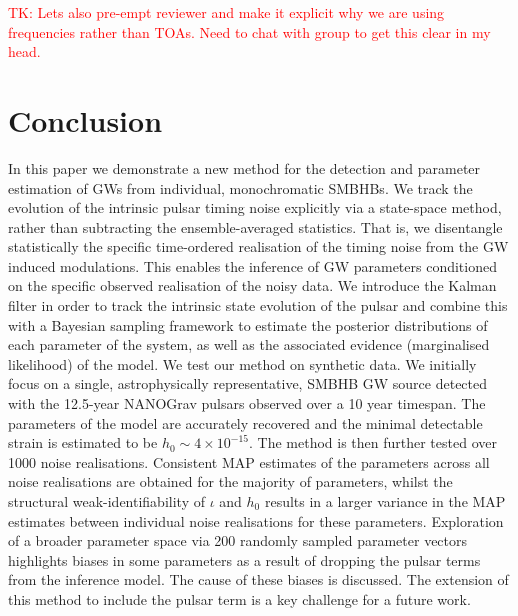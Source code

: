 \documentclass[fleqn,usenatbib,useAMS]{mnras}
\begin{document}
\textcolor{red}{TK: Lets also pre-empt reviewer and make it explicit why we are using frequencies rather than TOAs. Need to chat with group to get this clear in my head.}


\section{Conclusion}
In this paper we demonstrate a new method for the detection and parameter estimation of GWs from individual, monochromatic SMBHBs. We track the evolution of the intrinsic pulsar timing noise explicitly via a state-space method, rather than subtracting the ensemble-averaged statistics. That is, we disentangle statistically the specific time-ordered realisation of the timing noise from the GW induced modulations. This enables the inference of GW parameters conditioned on the specific observed realisation of the noisy data. We introduce the Kalman filter in order to track the intrinsic state evolution of the pulsar and combine this with a Bayesian sampling framework to estimate the posterior distributions of each parameter of the system, as well as the associated evidence (marginalised likelihood) of the model. We test our method on synthetic data. We initially focus on a single, astrophysically representative, SMBHB GW source detected with the 12.5-year NANOGrav pulsars observed over a 10 year timespan. The parameters of the model are accurately recovered and the minimal detectable strain is estimated to be $h_0 \sim 4 \times 10^{-15}$. The method is then further tested over 1000 noise realisations. Consistent MAP estimates of the parameters across all noise realisations are obtained for the majority of parameters, whilst the structural weak-identifiability of $\iota$ and $h_0$ results in a larger variance in the MAP estimates between individual noise realisations for these parameters. Exploration of a broader parameter space via 200 randomly sampled parameter vectors highlights biases in some parameters as a result of dropping the pulsar terms from the inference model. The cause of these biases is discussed. The extension of this method to include the pulsar term is a key challenge for a future work.
 
\appendix
\end{document}
